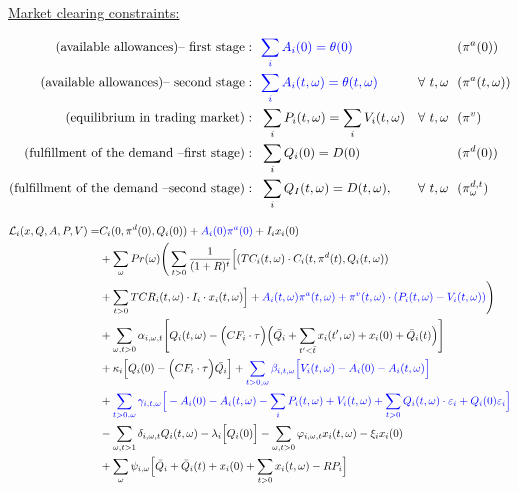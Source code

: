 \documentclass[11pt, letterpaper]{article}
\newcommand{\pia}{\textcolor[rgb]{0,0,1}}
\begin{document}
\underline{Market clearing constraints:}

\begin{align}
\textrm{(available allowances)-- first stage}: &  \ \ \pia{  \sum_{i} A_{i}(0) = \theta(0) }  &  & \ \  (\pi^{a}(0))\\
\textrm{(available allowances)-- second stage}: &  \ \ \pia{  \sum_{i} A_{i}(t,\omega) = \theta(t,\omega) }  &   \forall \ t,\omega & \ \ (\pi^{a}(t,\omega))\\
\textrm{(equilibrium in trading market)}: &   \ \  \sum_{i} P_i(t,\omega) = \sum_{i} V_i(t,\omega) & \forall \ t,\omega & \ \ (\pi^{v}) \\
\textrm{(fulfillment of the demand --first stage)}:  &   \ \  \sum_{i} Q_i(0) = D(0) &  & \ \ (\pi^d(0))\\
\textrm{(fulfillment of the demand --second stage)}:  &   \ \  \sum_{i} Q_I(t,\omega) = D(t,\omega), & \forall \ t,\omega & \ \ (\pi^{d,t}_\omega)
\end{align}


\begin{align}
    \mathcal{L}_i(x,Q,A,P,V) = &  C_i(0, \pi^d(0),Q_i(0))+ \pia{A_i(0) \pi^{a}(0)} + I_i x_i(0)  \nonumber \\ & +\sum_{\omega} Pr(\omega) \Bigg( \sum_{t>0} \frac{1}{(1+R)^t} \Big[ (TC_i(t,\omega)\cdot C_i(t,\pi^d(t),Q_i(t,\omega) )  \nonumber \\
 & + \sum_{t > 0} TCR_i(t,\omega) \cdot I_i\cdot x_i(t,\omega) \Big] + \pia{A_i(t,\omega)\pi^a(t,\omega)+\pi^v(t,\omega)\cdot \left(P_i(t,\omega)-V_i(t,\omega)\right) }\Bigg) \nonumber \\
 & +\sum_{\omega,t>0} \alpha_{i,\omega,t}\Bigg[  Q_i(t,\omega) - \Big(CF_i \cdot\tau\Big)  \Big(\bar{Q_i} + \sum_{t^{\prime}<\bar{t}} x_i(t^\prime,\omega) + x_i(0)+ \bar{Q}_i(t) \Big) \Bigg] \nonumber \\
 & +  \kappa_{i}\Big[Q_{i}(0)-\Big(CF_i\cdot\tau \Big)\bar{Q_i}\Big]  + \pia{\sum_{t>0,\omega}\beta_{i,t,\omega}\Big[  V_i(t,\omega)- A_{i}(0) -A_i(t,\omega) \Big] }\nonumber \\
 & + \pia{\sum_{t>0,\omega}\gamma_{i,t,\omega} \Big[ -A_{i}(0)-A_i(t,\omega) - \sum_{i}P_i(t,\omega) + V_i(t,\omega)+\sum_{t>0}Q_i(t, \omega)\cdot \varepsilon_{i}+Q_i(0)\varepsilon_{i}\Big]} \nonumber\\
     & - \sum_{\omega, t>1}\delta_{i,\omega,t} Q_i(t,\omega) - \lambda_{i}\Big[Q_i(0)\Big] - \sum_{\omega, t>0}\varphi_{i,\omega,t} x_i(t,\omega) - \xi_i x_i(0) \nonumber \\
     & + \sum_{\omega}\psi_{i,\omega} \Big[  \bar{Q}_i+\bar{Q}_i(t) + x_i(0)  + \sum_{t > 0} x_i(t,\omega) - RP_i \Big]
\end{align}
\end{document}
